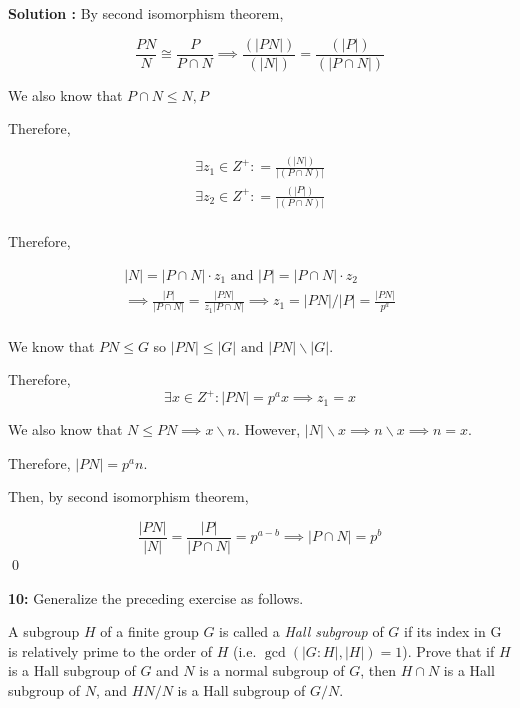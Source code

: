 \documentclass[11pt]{article}
\newcommand{\AND}{\text{ and }}
\newenvironment{exercise}[1]
	{\noindent \textbf{#1:}}
	{\par \vspace{0.5\baselineskip}}
\newenvironment{solution}[1][\unskip]
	{\noindent \textbf{Solution #1:} }
	{\qed \pagebreak}
\begin{document}
\begin{solution}
	By second isomorphism theorem,

	\[
		\frac{PN}{N} \cong \frac{P}{P \cap N}
		\implies \frac{(|PN|)}{(|N|)} = \frac{(|P|)}{(|P \cap N|)}
	\]

	We also know that $P \cap N \le N,P$

	Therefore,

	\[
		\begin{split}
			\exists z_1 \in Z^+ : = \frac{(|N|)}{|(P \cap N)|} \\
			\exists z_2 \in Z^+ : = \frac{(|P|)}{|(P \cap N)|} \\
		\end{split}
	\]

	Therefore,

	\[
		\begin{split}
			|N| = |P \cap N| \cdot z_1 \AND |P| = |P \cap N| \cdot z_2\\
			\implies \frac{|P|}{|P \cap N|} = \frac{|PN|}{z_1|P \cap N|}
			\implies z_1= |PN| / |P| = \frac{|PN|}{p^a} \\
		\end{split}
	\]

	We know that $PN \leqslant G$ so $|PN| \leqslant |G| \AND |PN| \backslash |G|$.

	Therefore,
	\[
		\exists x \in Z^+ : |PN| = p^ax \implies z_1 = x
	\]

	We also know that $N \leqslant PN \implies x \backslash n$.
	However, $|N| \backslash x \implies n \backslash x \implies n=x$.

	Therefore, $|PN| = p^an$.

	Then, by second isomorphism theorem,

	\[
	\frac{|PN|}{|N|} = \frac{|P|}{|P \cap N|} = p^{a-b} \implies |P \cap N| = p^b
	\]
\end{solution}

\begin{exercise}{10}
	Generalize the preceding exercise as follows.

	A subgroup $H$ of a finite group $G$ is called a \textit{Hall subgroup}
	of $G$ if its index in G is relatively prime to the order of $H$ 
	(i.e. $\operatorname{gcd}(|G:H|,|H|)=1$).
	Prove that if $H$ is a Hall subgroup of $G$ and $N$ is a normal subgroup of $G$,
	then $H \cap N$ is a Hall subgroup of $N$, and $HN/N$ is a Hall subgroup of $G / N$.
\end{exercise}
\end{document}
